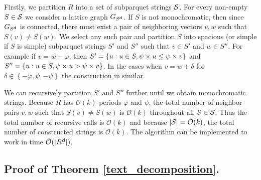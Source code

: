 \documentclass[11pt]{article}
\renewcommand{\O}{\mathcal{O}}
\newcommand{\tO}{\tilde{\mathcal{O}}}
\renewcommand{\phi}{\varphi}
\newcommand{\set}[1]{\left\lbrace #1 \right\rbrace}
\theoremstyle{plain}
\theoremstyle{definition}
\theoremstyle{remark}
\begin{document}
Firstly, we partition $R$ into a set of subparquet strings $\S$.
For every non-empty $S \in \S$ we consider a lattice graph $G_{\d{S}}$. If $S$ is not monochromatic, then since $G_{\d{S}}$ is connected, there must exist a pair of neighboring vectors $v, w$ such that $S(v) \neq S(w)$.
We select any such pair and partition $S$ into spacious (or simple if $S$ is simple) subparquet strings $S'$ and $S''$ such that $v \in S'$ and $w \in S''$.
For example if $v = w + \phi$, then $S' = \set{u : u \in S, \s{u} \le \s{v}}$ and $S'' = \set{u : u \in S, \s{u} > \s{v}}$.
In the cases when $v = w + \delta$ for $\delta \in \set{-\phi, \psi, -\psi}$ the construction in similar.

We can recursively partition $S'$ and $S''$ further until we obtain monochromatic strings.
Because $R$ has $\O(k)$-periods $\phi$ and $\psi$, the total number of neighbor pairs $v, w$ such that $S(v) \neq S(w)$ is $\O(k)$ throughout all $S \in \S$.
Thus the total number of recursive calls is $\O(k)$ and because $|\S| = \O(k)$, the total number of constructed strings is $\O(k)$.
The algorithm can be implemented to work in time $\tO(|\d{R}|)$.


\subsection{Proof of Theorem \ref{text_decomposition}.}
\end{document}
